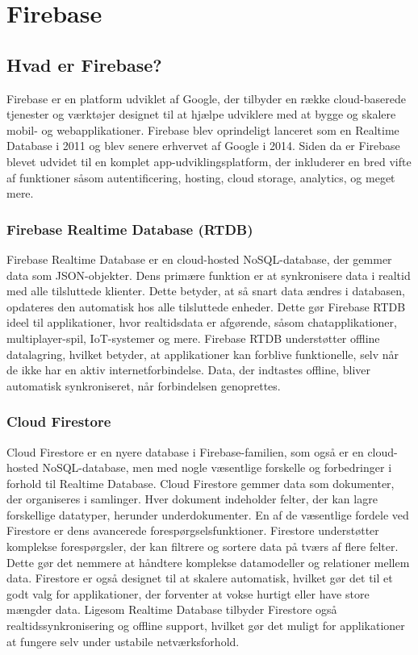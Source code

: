 \documentclass[12pt,a4paper]{book}
\begin{document}
	\chapter{Firebase}
	\section{Hvad er Firebase?}
	Firebase er en platform udviklet af Google, der tilbyder en række cloud-baserede tjenester og værktøjer designet til at hjælpe udviklere med at bygge og skalere mobil- og webapplikationer. Firebase blev oprindeligt lanceret som en Realtime Database i 2011 og blev senere erhvervet af Google i 2014. Siden da er Firebase blevet udvidet til en komplet app-udviklingsplatform, der inkluderer en bred vifte af funktioner såsom autentificering, hosting, cloud storage, analytics, og meget mere.
	
	\subsection*{Firebase Realtime Database (RTDB)}
	Firebase Realtime Database er en cloud-hosted NoSQL-database, der gemmer data som JSON-objekter. Dens primære funktion er at synkronisere data i realtid med alle tilsluttede klienter. Dette betyder, at så snart data ændres i databasen, opdateres den automatisk hos alle tilsluttede enheder. Dette gør Firebase RTDB ideel til applikationer, hvor realtidsdata er afgørende, såsom chatapplikationer, multiplayer-spil, IoT-systemer og mere.
	\newline\newline\noindent
	Firebase RTDB understøtter offline datalagring, hvilket betyder, at applikationer kan forblive funktionelle, selv når de ikke har en aktiv internetforbindelse. Data, der indtastes offline, bliver automatisk synkroniseret, når forbindelsen genoprettes. 
	
	\subsection*{Cloud Firestore}
	Cloud Firestore er en nyere database i Firebase-familien, som også er en cloud-hosted NoSQL-database, men med nogle væsentlige forskelle og forbedringer i forhold til Realtime Database. Cloud Firestore gemmer data som dokumenter, der organiseres i samlinger. Hver dokument indeholder felter, der kan lagre forskellige datatyper, herunder underdokumenter.
	\newline\newline\noindent
	En af de væsentlige fordele ved Firestore er dens avancerede forespørgselsfunktioner. Firestore understøtter komplekse forespørgsler, der kan filtrere og sortere data på tværs af flere felter. Dette gør det nemmere at håndtere komplekse datamodeller og relationer mellem data.
	\newline\newline\noindent
	Firestore er også designet til at skalere automatisk, hvilket gør det til et godt valg for applikationer, der forventer at vokse hurtigt eller have store mængder data. Ligesom Realtime Database tilbyder Firestore også realtidssynkronisering og offline support, hvilket gør det muligt for applikationer at fungere selv under ustabile netværksforhold.
	
\end{document}
